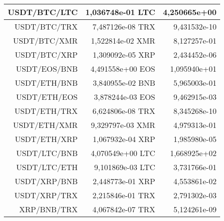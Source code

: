 \begin{table}
\begin{tabular}{|| r | r | r ||}
 \hline USDT/BTC/LTC & 1,036748e-01 LTC & 4,250665e+00\\ 
 \hline USDT/BTC/TRX & 7,487126e-08 TRX & 9,431532e-10\\ 
 \hline USDT/BTC/XMR & 1,522814e-02 XMR & 8,127257e-01\\ 
 \hline USDT/BTC/XRP & 1,309092e-05 XRP & 2,434452e-06\\ 
 \hline USDT/EOS/BNB & 4,491558e+00 EOS & 1,095940e+01\\ 
 \hline USDT/ETH/BNB & 3,840955e-02 BNB & 5,965003e-01\\ 
 \hline USDT/ETH/EOS & 3,878244e-03 EOS & 9,462915e-03\\ 
 \hline USDT/ETH/TRX & 6,624806e-08 TRX & 8,345268e-10\\ 
 \hline USDT/ETH/XMR & 9,329797e-03 XMR & 4,979313e-01\\ 
 \hline USDT/ETH/XRP & 1,067932e-04 XRP & 1,985980e-05\\ 
 \hline USDT/LTC/BNB & 4,070549e+00 LTC & 1,668925e+02\\ 
 \hline USDT/LTC/ETH & 9,101869e-03 LTC & 3,731766e-01\\ 
 \hline USDT/XRP/BNB & 2,448773e-01 XRP & 4,553861e-02\\ 
 \hline USDT/XRP/TRX & 2,215846e-01 TRX & 2,791302e-03\\ 
 \hline XRP/BNB/TRX & 4,067842e-07 TRX & 5,124261e-09\\ 
 \hline
\end{tabular}
\end{table}